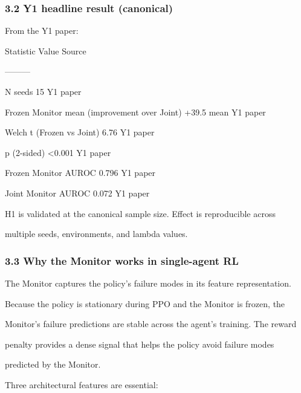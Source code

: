 \documentclass[11pt]{article}
\begin{document}
\subsubsection{3.2 Y1 headline result
(canonical)}\label{y1-headline-result-canonical}

From the Y1 paper:

Statistic \textbar{} Value \textbar{} Source \textbar{}

\textbar---\textbar---\textbar---\textbar{}

N seeds \textbar{} 15 \textbar{} Y1 paper \textbar{}

Frozen Monitor mean (improvement over Joint) \textbar{} +39.5 mean
\textbar{} Y1 paper \textbar{}

Welch t (Frozen vs Joint) \textbar{} 6.76 \textbar{} Y1 paper \textbar{}

p (2-sided) \textbar{} \textless0.001 \textbar{} Y1 paper \textbar{}

Frozen Monitor AUROC \textbar{} 0.796 \textbar{} Y1 paper \textbar{}

Joint Monitor AUROC \textbar{} 0.072 \textbar{} Y1 paper \textbar{}

H1 is validated at the canonical sample size. Effect is reproducible
across

multiple seeds, environments, and lambda values.

\subsubsection{3.3 Why the Monitor works in single-agent
RL}\label{why-the-monitor-works-in-single-agent-rl}

The Monitor captures the policy's failure modes in its feature
representation.

Because the policy is stationary during PPO and the Monitor is frozen,
the

Monitor's failure predictions are stable across the agent's training.
The reward

penalty provides a dense signal that helps the policy avoid failure
modes

predicted by the Monitor.

Three architectural features are essential:
\end{document}
